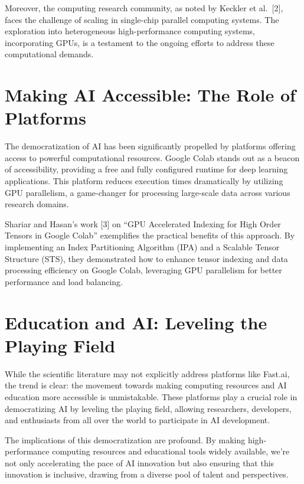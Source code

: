 \documentclass[
  journal,
]{IEEEtran}%
\begin{document}
Moreover, the computing research community, as noted by Keckler et
al.~{[}2{]}, faces the challenge of scaling in single-chip parallel
computing systems. The exploration into heterogeneous high-performance
computing systems, incorporating GPUs, is a testament to the ongoing
efforts to address these computational demands.

\section{Making AI Accessible: The Role of
Platforms}\label{making-ai-accessible-the-role-of-platforms}

The democratization of AI has been significantly propelled by platforms
offering access to powerful computational resources. Google Colab stands
out as a beacon of accessibility, providing a free and fully configured
runtime for deep learning applications. This platform reduces execution
times dramatically by utilizing GPU parallelism, a game-changer for
processing large-scale data across various research domains.

Shariar and Hasan's work {[}3{]} on ``GPU Accelerated Indexing for High
Order Tensors in Google Colab'' exemplifies the practical benefits of
this approach. By implementing an Index Partitioning Algorithm (IPA) and
a Scalable Tensor Structure (STS), they demonstrated how to enhance
tensor indexing and data processing efficiency on Google Colab,
leveraging GPU parallelism for better performance and load balancing.

\section{Education and AI: Leveling the Playing
Field}\label{education-and-ai-leveling-the-playing-field}

While the scientific literature may not explicitly address platforms
like Fast.ai, the trend is clear: the movement towards making computing
resources and AI education more accessible is unmistakable. These
platforms play a crucial role in democratizing AI by leveling the
playing field, allowing researchers, developers, and enthusiasts from
all over the world to participate in AI development.

The implications of this democratization are profound. By making
high-performance computing resources and educational tools widely
available, we're not only accelerating the pace of AI innovation but
also ensuring that this innovation is inclusive, drawing from a diverse
pool of talent and perspectives.
\end{document}
